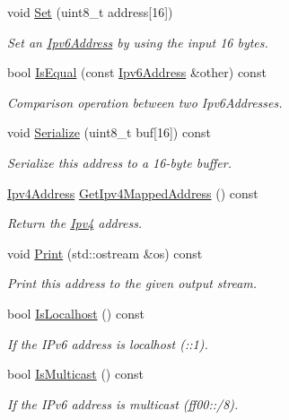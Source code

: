\begin{DoxyCompactItemize}
void \hyperlink{classns3_1_1Ipv6Address_a60d4278084bddadfc35195765e5f33df}{Set} (uint8\+\_\+t address\mbox{[}16\mbox{]})
\begin{DoxyCompactList}\small\item\em Set an \hyperlink{classns3_1_1Ipv6Address}{Ipv6\+Address} by using the input 16 bytes. \end{DoxyCompactList}\item 
bool \hyperlink{classns3_1_1Ipv6Address_a4118c22001a38bf7323936081834b9b5}{Is\+Equal} (const \hyperlink{classns3_1_1Ipv6Address}{Ipv6\+Address} \&other) const 
\begin{DoxyCompactList}\small\item\em Comparison operation between two Ipv6\+Addresses. \end{DoxyCompactList}\item 
void \hyperlink{classns3_1_1Ipv6Address_adf5b453892de2893a371380ab299db88}{Serialize} (uint8\+\_\+t buf\mbox{[}16\mbox{]}) const 
\begin{DoxyCompactList}\small\item\em Serialize this address to a 16-\/byte buffer. \end{DoxyCompactList}\item 
\hyperlink{classns3_1_1Ipv4Address}{Ipv4\+Address} \hyperlink{classns3_1_1Ipv6Address_ac3d2ec50a06a177d143eb69bb0d2d5df}{Get\+Ipv4\+Mapped\+Address} () const 
\begin{DoxyCompactList}\small\item\em Return the \hyperlink{classns3_1_1Ipv4}{Ipv4} address. \end{DoxyCompactList}\item 
void \hyperlink{classns3_1_1Ipv6Address_af1da6681e04f3dd56c19045b1f18f201}{Print} (std\+::ostream \&os) const 
\begin{DoxyCompactList}\small\item\em Print this address to the given output stream. \end{DoxyCompactList}\item 
bool \hyperlink{classns3_1_1Ipv6Address_a73db75839a77d0ef0ec0770fb4dc06cd}{Is\+Localhost} () const 
\begin{DoxyCompactList}\small\item\em If the I\+Pv6 address is localhost (\+:\+:1). \end{DoxyCompactList}\item 
bool \hyperlink{classns3_1_1Ipv6Address_a0657bb007d3c5618f3f6000b5054df72}{Is\+Multicast} () const 
\begin{DoxyCompactList}\small\item\em If the I\+Pv6 address is multicast (ff00\+:\+:/8). \end{DoxyCompactList}\item 

\end{DoxyCompactItemize}
